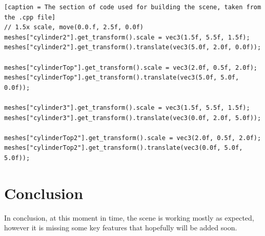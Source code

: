 \documentclass[10pt, a4paper]{article}
\begin{document}
\begin{lstlisting}[caption = The section of code used for building the scene, taken from the .cpp file]
// 1.5x scale, move(0.0.f, 2.5f, 0.0f)
meshes["cylinder2"].get_transform().scale = vec3(1.5f, 5.5f, 1.5f);
meshes["cylinder2"].get_transform().translate(vec3(5.0f, 2.0f, 0.0f));

meshes["cylinderTop"].get_transform().scale = vec3(2.0f, 0.5f, 2.0f);
meshes["cylinderTop"].get_transform().translate(vec3(5.0f, 5.0f, 0.0f));

meshes["cylinder3"].get_transform().scale = vec3(1.5f, 5.5f, 1.5f);
meshes["cylinder3"].get_transform().translate(vec3(0.0f, 2.0f, 5.0f));

meshes["cylinderTop2"].get_transform().scale = vec3(2.0f, 0.5f, 2.0f);
meshes["cylinderTop2"].get_transform().translate(vec3(0.0f, 5.0f, 5.0f));

\end{lstlisting}




	
\section{Conclusion}
In conclusion, at this moment in time, the scene is working mostly as expected, however it is missing some key features that hopefully will be added soon. 
	

		
\end{document}
